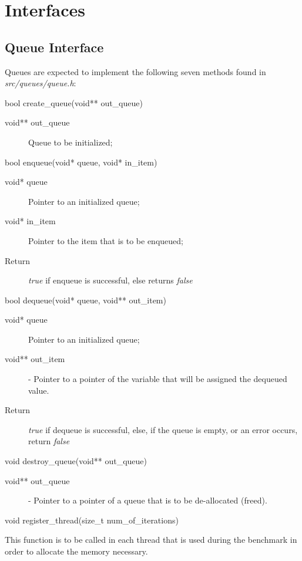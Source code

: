 \chapter{Interfaces}
\section{Queue Interface}
\label{sec:queue_interface}
Queues are expected to implement the following seven methods found in
\emph{src/queues/queue.h}:

\begin{description}
\item bool create\_queue(void** out\_queue)
	\begin{description}
		\item[void** out\_queue] Queue to be initialized;
	\end{description}
\item bool enqueue(void* queue, void* in\_item)
	\begin{description}
		\item[void* queue] Pointer to an initialized queue;
		\item[void* in\_item] Pointer to the item that is to be enqueued;
		\item[Return] \emph{true} if enqueue is successful, else returns \emph{false}
	\end{description}
\item bool dequeue(void* queue, void** out\_item)
	\begin{description}
		\item[void* queue] Pointer to an initialized queue;
		\item[void** out\_item] - Pointer to a pointer of the variable that will be assigned the dequeued value.
		\item[Return] \emph{true} if dequeue is successful, else, if the queue is empty, or an error occurs, return \emph{false}
	\end{description}
\item void destroy\_queue(void** out\_queue)
	\begin{description}
		\item[void** out\_queue] - Pointer to a pointer of a queue that is to be de-allocated (freed).
	\end{description}
\item void register\_thread(size\_t num\_of\_iterations)
	\begin{description}
		\item This function is to be called in each thread that is used during the benchmark in order to allocate the memory necessary.

\end{description}
\end{description}
